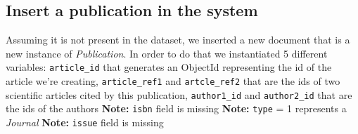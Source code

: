 \documentclass{Configuration_Files/PoliMi3i_thesis}
\begin{document}
\subsection{Insert a publication in the system}
\label{pub_insert}
Assuming it is not present in the dataset, we inserted a new document that is a new instance of \emph{Publication}.
In order to do that we instantiated 5 different variables: \verb |article_id| that generates an ObjectId representing
the id of the article we're creating, \verb |article_ref1| and \verb |artcle_ref2| that are the ids of two scientific
articles cited by this publication, \verb |author1_id| and \verb |author2_id| that are the ids of the authors\newline
\textbf{Note:} \verb |isbn| field is missing \newline
\textbf{Note:} \verb |type| = 1 represents a \emph{Journal} \newline
\textbf{Note:} \verb |issue| field is missing
\end{document}

